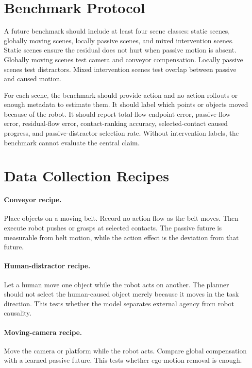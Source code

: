 \documentclass{article}
\begin{document}
\section{Benchmark Protocol}

A future benchmark should include at least four scene classes: static scenes, globally
moving scenes, locally passive scenes, and mixed intervention scenes.  Static scenes
ensure the residual does not hurt when passive motion is absent.  Globally moving scenes
test camera and conveyor compensation.  Locally passive scenes test distractors.  Mixed
intervention scenes test overlap between passive and caused motion.

For each scene, the benchmark should provide action and no-action rollouts or enough
metadata to estimate them.  It should label which points or objects moved because of the
robot.  It should report total-flow endpoint error, passive-flow error, residual-flow
error, contact-ranking accuracy, selected-contact caused progress, and passive-distractor
selection rate.  Without intervention labels, the benchmark cannot evaluate the central
claim.

\section{Data Collection Recipes}

\paragraph{Conveyor recipe.}
Place objects on a moving belt.  Record no-action flow as the belt moves.  Then execute
robot pushes or grasps at selected contacts.  The passive future is measurable from belt
motion, while the action effect is the deviation from that future.

\paragraph{Human-distractor recipe.}
Let a human move one object while the robot acts on another.  The planner should not
select the human-caused object merely because it moves in the task direction.  This
tests whether the model separates external agency from robot causality.

\paragraph{Moving-camera recipe.}
Move the camera or platform while the robot acts.  Compare global compensation with a
learned passive future.  This tests whether ego-motion removal is enough.
\end{document}
